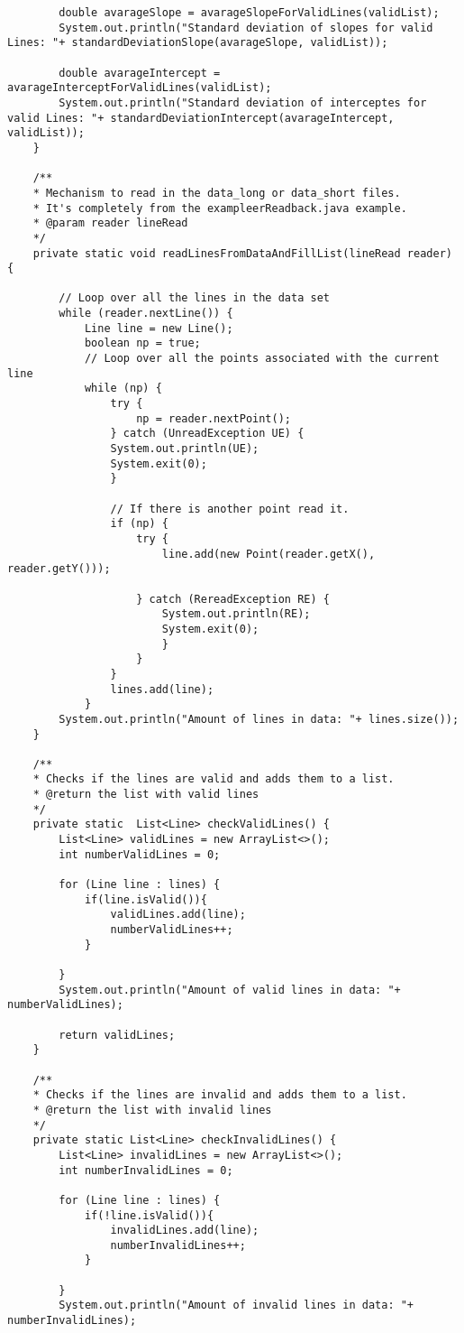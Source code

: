 \begin{lstlisting}
		double avarageSlope = avarageSlopeForValidLines(validList);
		System.out.println("Standard deviation of slopes for valid Lines: "+ standardDeviationSlope(avarageSlope, validList));
		
		double avarageIntercept = avarageInterceptForValidLines(validList);
		System.out.println("Standard deviation of interceptes for valid Lines: "+ standardDeviationIntercept(avarageIntercept, validList));
	}
	
	/**
	* Mechanism to read in the data_long or data_short files.
	* It's completely from the exampleerReadback.java example. 
	* @param reader lineRead
	*/
	private static void readLinesFromDataAndFillList(lineRead reader) {
		
		// Loop over all the lines in the data set
		while (reader.nextLine()) {
			Line line = new Line();
			boolean np = true;
			// Loop over all the points associated with the current line
			while (np) {
				try {
					np = reader.nextPoint();
				} catch (UnreadException UE) {
				System.out.println(UE);
				System.exit(0);
				}
			
				// If there is another point read it.
				if (np) {
					try {
						line.add(new Point(reader.getX(), reader.getY()));
					
					} catch (RereadException RE) {
						System.out.println(RE);
						System.exit(0);
						}
					}
				}
				lines.add(line);
			}
		System.out.println("Amount of lines in data: "+ lines.size());
	}

	/**
	* Checks if the lines are valid and adds them to a list.
	* @return the list with valid lines
	*/
	private static  List<Line> checkValidLines() {
		List<Line> validLines = new ArrayList<>();
		int numberValidLines = 0;
		
		for (Line line : lines) {
			if(line.isValid()){
				validLines.add(line);
				numberValidLines++;
			}
			
		}
		System.out.println("Amount of valid lines in data: "+ numberValidLines);
		
		return validLines;
	}
	
	/**
	* Checks if the lines are invalid and adds them to a list.
	* @return the list with invalid lines
	*/
	private static List<Line> checkInvalidLines() {
		List<Line> invalidLines = new ArrayList<>();
		int numberInvalidLines = 0;
		
		for (Line line : lines) {
			if(!line.isValid()){
				invalidLines.add(line);
				numberInvalidLines++;
			}
			
		}
		System.out.println("Amount of invalid lines in data: "+ numberInvalidLines);
		

\end{lstlisting}
